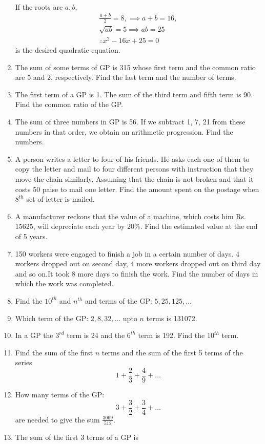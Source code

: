 \begin{enumerate}[label=\thesubsection.\arabic*.,ref=\thesubsection.\theenumi]
	\\
	\solution If the roots are $a, b$,
\begin{align}
	\frac{a+b}{2} = 8, \implies a+b = 16,
	\\
	\sqrt{ab} = 5 \implies ab = 25
	\\
	\therefore 
	x^2-16x + 25=0
\end{align}
is the desired quadratic equation.
\item The sum of some terms of GP  is 315 whose first term and the common ratio are 5 and 2, respectively. Find the last term and the number of terms.
\item  The first term of a GP  is 1. The sum of the third term and fifth term is 90. Find the common ratio of the GP.
\item The sum of three numbers in GP  is 56. If we subtract 1, 7, 21 from these numbers in that order, we obtain an arithmetic progression. Find the numbers.
\item A person writes a letter to four of his friends. He asks each one of them to copy
the letter and mail to four different persons with instruction that they move the
chain similarly. Assuming that the chain is not broken and that it costs 50 paise to
mail one letter. Find the amount spent on the postage when $8^{th}$ set of letter is
mailed. 
\item A manufacturer reckons that the value of a machine,  which costs him Rs. 15625,  will depreciate each year by 20\%. Find the estimated value at the end of 5 years. 
\item 150 workers were engaged to finish a job in a certain number of days. 4 workers dropped out on second day,  4 more workers dropped out on third day and so on.It took 8 more days to finish the work. Find the number of days in which the work was completed.
	\item Find the $10^{th}$ and $n^{th}$ and  terms of the GP: $5, 25, 125, \dots$
	\item Which term of the GP: $2, 8, 32, \dots $ upto $n$ terms is 131072.
	\item In a GP the $3^{rd}$ term is 24 and the $6^{th}$ term is 192.  Find the $10^{th}$ term.
	\item Find the sum of the first $n$ terms and the sum of the first 5 terms of the series 
		$$ 1 + \frac{2}{3}+\frac{4}{9}+\dots$$
	\item How many terms of the GP: 
		$$ 3 + \frac{3}{2}+\frac{3}{4}+\dots$$
		are needed to give the sum $\frac{3069}{512}$.
	\item The sum of the first 3 terms of a GP is 

\end{enumerate}
